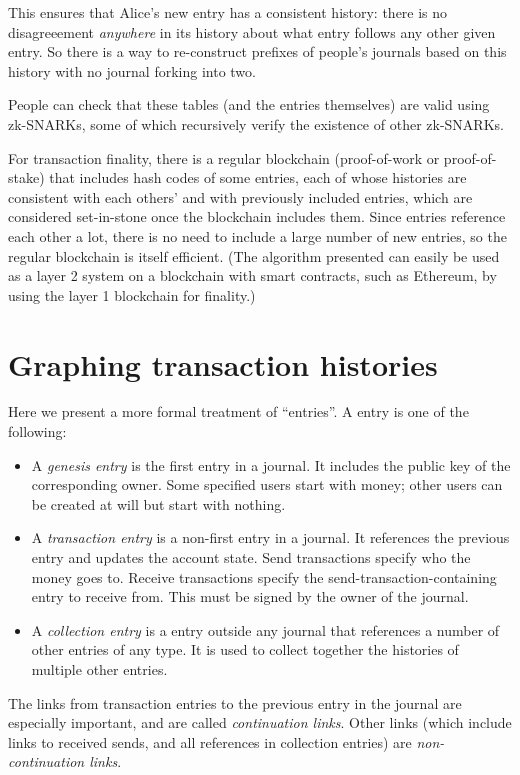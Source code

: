 \documentclass{article}
\begin{document}
This ensures that Alice's new entry has a consistent history: there is no disagreeement \emph{anywhere} in its history about what entry follows any other given entry.  So there is a way to re-construct prefixes of people's journals based on this history with no journal forking into two.

People can check that these tables (and the entries themselves) are valid using zk-SNARKs, some of which recursively verify the existence of other zk-SNARKs.

For transaction finality, there is a regular blockchain (proof-of-work or proof-of-stake) that includes hash codes of some entries, each of whose histories are consistent with each others' and with previously included entries, which are considered set-in-stone once the blockchain includes them.  Since entries reference each other a lot, there is no need to include a large number of new entries, so the regular blockchain is itself efficient.  (The algorithm presented can easily be used as a layer 2 system on a blockchain with smart contracts, such as Ethereum, by using the layer 1 blockchain for finality.)

\section{Graphing transaction histories}

Here we present a more formal treatment of ``entries''.  A entry is one of the following:

\begin{itemize}
  \item A \emph{genesis entry} is the first entry in a journal.  It includes the public key of the corresponding owner.  Some specified users start with money; other users can be created at will but start with nothing.
  \item A \emph{transaction entry} is a non-first entry in a journal.  It references the previous entry and updates the account state.  Send transactions specify who the money goes to.  Receive transactions specify the send-transaction-containing entry to receive from.  This must be signed by the owner of the journal.
  \item A \emph{collection entry} is a entry outside any journal that references a number of other entries of any type.  It is used to collect together the histories of multiple other entries.
\end{itemize}

The links from transaction entries to the previous entry in the journal are especially important, and are called \emph{continuation links}.  Other links (which include links to received sends, and all references in collection entries) are \emph{non-continuation links}.
\end{document}
